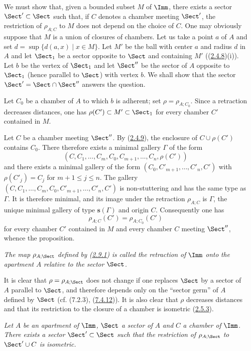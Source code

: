 \documentclass[12pt,a4paper,oneside,english]{smfart}
\makeatletter
\newcommand{\btanchor}[1]{\leavevmode\Hy@raisedlink{\hypertarget{bt:#1}{}}}
\newcommand{\btpageanchor}[1]{\Hy@raisedlink{\hypertarget{p:#1}{}}}
\newcommand{\btref}[1]{\hyperlink{bt:#1}{#1}}
\newcommand{\btpage}[1]{\marginnote{p.~#1}\btpageanchor{#1}}
\newcommand{\pagemark}[1]{\btpage{#1}}
\theoremstyle{definition}
\theoremstyle{bt}
\makeatother
\begin{document}
\medskip
We must show that, given a bounded subset $M$ of $\Imm$, there exists a sector
$\Sect'\subset\Sect$ such that, if $C$ denotes a chamber meeting $\Sect'$, the
restriction of $\rho_{A;C}$ to $M$ does not depend on the choice of $C$. One
may obviously suppose that $M$ is a union of closures of chambers. Let us take
a point $a$ of $A$ and set $d=\sup\{d(a,x)\mid x\in M\}$. Let $M'$ be the ball
with center $a$ and radius $d$ in $A$ and let $\Sect_1$ be a sector opposite
to $\Sect$ and
\pagemark{58}
containing $M'$ ((\btref{2.4.8})(i)). Let $b$ be the vertex of $\Sect_1$ and let
$\Sect''$ be the sector of $A$ opposite to $\Sect_1$ (hence parallel to
$\Sect$) with vertex $b$. We shall show that the sector
$\Sect'=\Sect\cap\Sect''$ answers the question.

Let $C_0$ be a chamber of $A$ to which $b$ is adherent; set
$\rho=\rho_{A;C_0}$. Since a retraction decreases distances, one has
$\rho(C')\subset M'\subset\Sect_1$ for every chamber $C'$ contained in $M$.

Let $C$ be a chamber meeting $\Sect''$. By (\btref{2.4.9}), the enclosure of
$C\cup\rho(C')$ contains $C_0$. There therefore exists a minimal gallery
$\Gamma$ of the form
\[
(C,C_1,\dots,C_m,C_0,C_{m+1},\dots,C_n,\rho(C'))
\]
and there exists a minimal gallery of the form $(C_0,C'_{m+1},\dots,C'_n,C')$
with $\rho(C'_j)=C_j$ for $m+1\le j\le n$. The gallery
$(C,C_1,\dots,C_m,C_0,C'_{m+1},\dots,C'_n,C')$ is non-stuttering and has
the same type as $\Gamma$. It is therefore minimal, and its image under the
retraction $\rho_{A;C}$ is $\Gamma$, the unique minimal gallery of type
$\mathbf{s}(\Gamma)$ and origin $C$. Consequently one has
\[
\rho_{A;C}(C')=\rho_{A;C_0}(C')
\]
for every chamber $C'$ contained in $M$ and every chamber $C$ meeting
$\Sect''$, whence the proposition.

\btanchor{2.9.2}
\emph{The map $\rho_{A;\Sect}$ defined by (\btref{2.9.1}) is called the retraction of
$\Imm$ onto the apartment $A$ relative to the sector $\Sect$.}

\medskip
It is clear that $\rho=\rho_{A;\Sect}$ does not change if one replaces
$\Sect$ by a sector of $A$ parallel to $\Sect$, and therefore depends only on
the ``sector germ'' of $A$ defined by $\Sect$ (cf. (7.2.3), (\btref{7.4.12})). It
is also clear that $\rho$ decreases distances and that its restriction to the
closure of a chamber is isometric (\btref{2.5.3}).

\btanchor{2.9.3}
\emph{Let $A$ be an apartment of $\Imm$, $\Sect$ a sector of $A$ and $C$ a
chamber of $\Imm$. There exists a sector $\Sect'\subset\Sect$ such that the
restriction of $\rho_{A;\Sect}$ to $\Sect'\cup C$ is isometric.}
\end{document}
